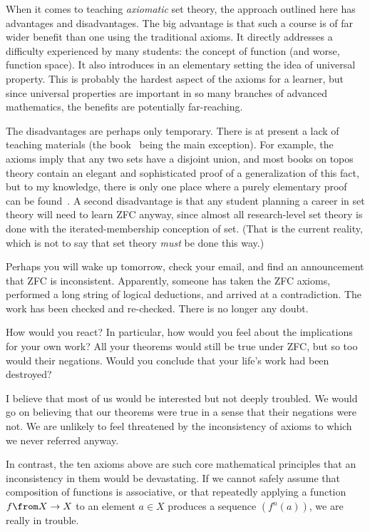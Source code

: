 \documentclass[12pt]{article}
\begin{document}
When it comes to teaching \emph{axiomatic} set theory, the approach
outlined here has advantages and disadvantages.  The big advantage is that
such a course is of far wider benefit than one using the traditional
axioms.  It directly addresses a difficulty experienced by many students:
the concept of function (and worse, function space).  It also introduces in
an elementary setting the idea of universal property.  This is probably the
hardest aspect of the axioms for a learner, but since universal properties
are important in so many branches of advanced mathematics, the benefits are
potentially far-reaching.

The disadvantages are perhaps only temporary.  There is at present a lack
of teaching materials (the book~\cite{LaRo} being the main exception).  For
example, the axioms imply that any two sets have a disjoint union, and
most books on topos theory contain an elegant and sophisticated proof of a
generalization of this fact, but to my knowledge, there is only one place where
a purely elementary proof can be found~\cite{TrimETCS3}.  A second
disadvantage is that any student planning a career in set theory will need
to learn ZFC anyway, since almost all research-level set theory is done
with the iterated-membership conception of set.  (That is the current
reality, which is not to say that set theory \emph{must} be done this way.)


Perhaps you will wake up tomorrow, check your email, and find an
announcement that ZFC is inconsistent.  Apparently, someone has taken the
ZFC axioms, performed a long string of logical deductions, and arrived at a
contradiction.  The work has been checked and re-checked.  There is no
longer any doubt.

How would you react?  In particular, how would you feel about the
implications for your own work?  All your theorems would still be true
under ZFC, but so too would their negations.  Would you conclude that your
life's work had been destroyed?

I believe that most of us would be interested but not deeply troubled.
We would go on believing that our theorems were true in a sense that their
negations were not.  We are unlikely to feel threatened by the
inconsistency of axioms to which we never referred anyway.

In contrast, the ten axioms above are such core mathematical principles
that an inconsistency in them would be devastating.  If we cannot safely
assume that composition of functions is associative, or that repeatedly
applying a function $f\from X \to X$ to an element $a \in X$ produces a
sequence $(f^n(a))$, we are really in trouble.
\end{document}
